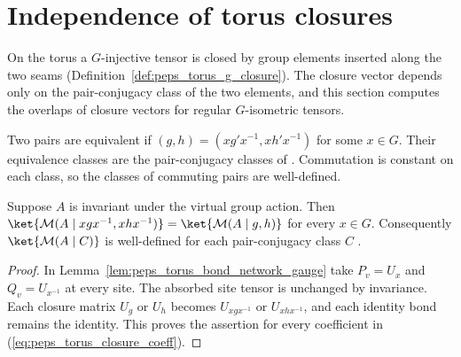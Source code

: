 \section{Independence of torus closures}%
\label{sec:peps_torus_closure_independence}

On the torus a $G$-injective tensor is closed by group elements inserted along
the two seams (Definition~\ref{def:peps_torus_g_closure}). The closure vector
depends only on the pair-conjugacy class of the two elements, and this section
computes the overlaps of closure vectors for regular $G$-isometric tensors.

\begin{definition}%
    \label{def:peps_pair_conjugacy}
    \leanok
    Two pairs are equivalent if
    $(g,h)=(xg'x^{-1},xh'x^{-1})$ for some $x\in G$. Their equivalence
    classes are the pair-conjugacy classes of
    \cite[Definition~5.8]{Schuch2010PEPS}. Commutation is constant on each
    class, so the classes of commuting pairs are well-defined.
\end{definition}

\begin{lemma}%
    \label{thm:peps_torus_pair_conjugacy}
    \leanok
    Suppose $A$ is invariant under the virtual group action. Then
    $\ket{\mathcal M(A\mid xgx^{-1},xhx^{-1})}
        =\ket{\mathcal M(A\mid g,h)}$ for every $x\in G$.
    Consequently $\ket{\mathcal M(A\mid C)}$ is well-defined for each
    pair-conjugacy class $C$ \cite[Definition~5.8]{Schuch2010PEPS}.
\end{lemma}

\begin{proof}\leanok
    In Lemma~\ref{lem:peps_torus_bond_network_gauge} take $P_v=U_x$ and
    $Q_v=U_{x^{-1}}$ at every site. The absorbed site tensor is unchanged
    by invariance. Each closure matrix $U_g$ or $U_h$ becomes
    $U_{xgx^{-1}}$ or $U_{xhx^{-1}}$, and each identity bond remains the
    identity. This proves the assertion for every coefficient in
    (\ref{eq:peps_torus_closure_coeff}).
\end{proof}

